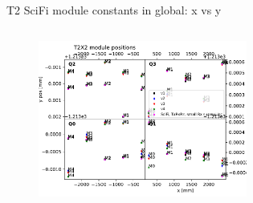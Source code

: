 \documentclass[aspectratio=1610, 12pt]{beamer}
\begin{document}
\begin{frame}{T2 SciFi module constants in global: x vs y}
\begin{columns}
\begin{column}[c]{0.5\textwidth}
\begin{figure}
        \includegraphics[width=0.61\textwidth]{plots/out_x_y_pos/retest_x_vs_zT2X2.pdf}
      \end{figure}
    \end{column}
  \end{columns}
\end{frame}
\end{document}
